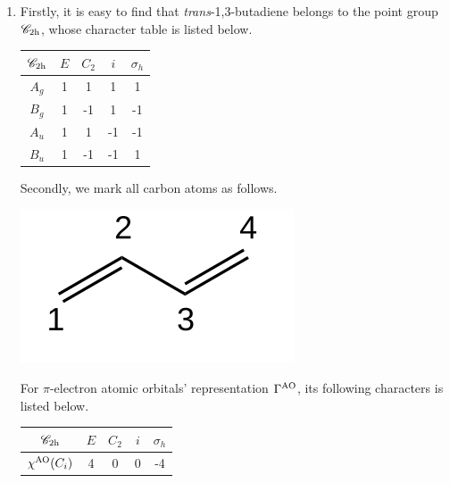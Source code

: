 \documentclass[a4paper]{book}
\newcommand{\AO}{{\rm AO}}
\begin{document}
	\begin{solution}

		\begin{enumerate}[label=(\alph*)]
	
		\item Firstly, it is easy to find that {\it trans}-1,3-butadiene belongs to the point group $\mathscr{C}_{\rm 2h}$, whose character table is listed below.
		\begin{center}
		\setlength{\abovecaptionskip}{-0.1em}
		\begin{tabular}{ccccc}\hline
	$\mathscr{C}_{\rm 2h}$ & $E$ & $C_2$ & $i$ & $\sigma_h$ \\ \hline
			$A_g$	&	1	&	1	&	1	&	1	\\
			$B_g$	&	1	&	-1	&	1	&	-1	\\
			$A_u$	&	1	&	1	&	-1	&	-1	\\
			$B_u$ 	&	1	&	-1	&	-1	&	1	\\ \hline
		\end{tabular}
		\setlength{\belowcaptionskip}{-0.2em}
		\end{center}
		
		Secondly, we mark all carbon atoms as follows.
		\begin{center}
		\includegraphics[scale=1.0]{./structures/exercise_1/trans-1,3-butadiene/0.png}
		\setlength{\abovecaptionskip}{-0.3em}
		\setlength{\belowcaptionskip}{-0.8em}
		\end{center}				

		For $\pi$-electron atomic orbitals' representation $\Gamma^{\rm AO}$, its following characters is listed below.
		\begin{center}
		\setlength{\abovecaptionskip}{-0.3em}
		\begin{tabular}{ccccc}\hline
	$\mathscr{C}_{\rm 2h}$ & $E$ & $C_2$ & $i$ & $\sigma_h$ \\ \hline
	$\chi^{\AO}(C_i)$	&	4	&	0	&	0	&	-4	\\ \hline
		\end{tabular}\vspace*{-0.5em}
		\end{center}
		

\end{enumerate}
\end{solution}
\end{document}
